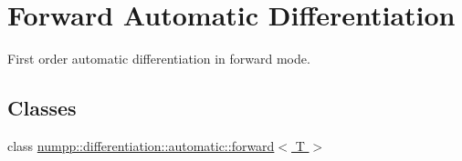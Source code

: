 \hypertarget{group__numpp__differentiation__forward__automatic}{}\section{Forward Automatic Differentiation}
\label{group__numpp__differentiation__forward__automatic}


First order automatic differentiation in forward mode.  


\subsection*{Classes}
\begin{DoxyCompactItemize}
\item 
class \hyperlink{classnumpp_1_1differentiation_1_1automatic_1_1forward}{numpp\+::differentiation\+::automatic\+::forward$<$ T $>$}
\end{DoxyCompactItemize}
